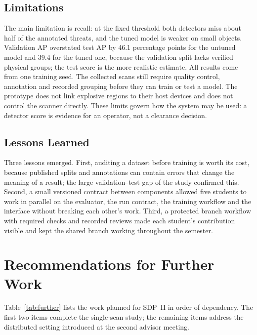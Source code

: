 \subsection{Limitations}
The main limitation is recall: at the fixed threshold both detectors miss about
half of the annotated threats, and the tuned model is weaker on small objects.
Validation AP overstated test AP by 46.1 percentage points for the untuned model
and 39.4 for the tuned one, because the validation split lacks verified physical
groups; the test score is the more realistic estimate. All results come from one training
seed. The collected scans still require quality control,
annotation and recorded grouping before they can train or test a model. The prototype does
not link explosive regions to their host devices and does not control the scanner
directly. These limits govern how the system may be used: a detector
score is evidence for an operator, not a clearance decision.

\subsection{Lessons Learned}
Three lessons emerged. First, auditing a dataset before training is worth its cost,
because published splits and annotations can contain errors that change the
meaning of a result; the large validation--test gap of the study confirmed this. Second, a small versioned contract between components allowed
five students to work in parallel on the evaluator, the run contract, the training
workflow and the interface without breaking each other's work. Third, a protected
branch workflow with required checks and recorded reviews made each student's
contribution visible and kept the shared branch working throughout the semester.

\section{Recommendations for Further Work}\label{sec:further}
Table~\ref{tab:further} lists the work planned for SDP~II in order of dependency.
The first two items complete the single-scan study; the remaining items address
the distributed setting introduced at the second advisor meeting.

